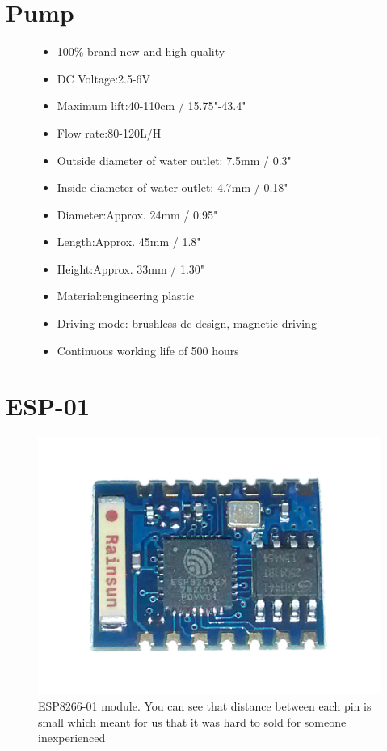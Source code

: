 \documentclass[a4paper,12pt,twoside,openright,titlepage]{book}
\begin{document}
\section{Pump}
\begin{figure}[ht!]
	\begin{itemize}
	\item 100\% brand new and high quality
	\item DC Voltage:2.5-6V
	\item Maximum lift:40-110cm / 15.75"-43.4"
	\item Flow rate:80-120L/H
	\item Outside diameter of water outlet: 7.5mm / 0.3"
	\item Inside diameter of water outlet: 4.7mm / 0.18"
	\item Diameter:Approx. 24mm / 0.95"
	\item Length:Approx. 45mm / 1.8"
	\item Height:Approx. 33mm / 1.30"
	\item Material:engineering plastic
	\item Driving mode: brushless dc design, magnetic driving
	\item Continuous working life of 500 hours
	\end{itemize}
	\label{fig:pump description}
\end{figure}

\section{ESP-01}
\begin{figure}[!ht]
	\centering
		\includegraphics[scale=0.20]{ESP-01}
	\caption{ESP8266-01 module. You can see that distance between each pin is small which meant for us that it was hard to sold for someone inexperienced}
	\label{fig:ESP}
\end{figure}
\end{document}
